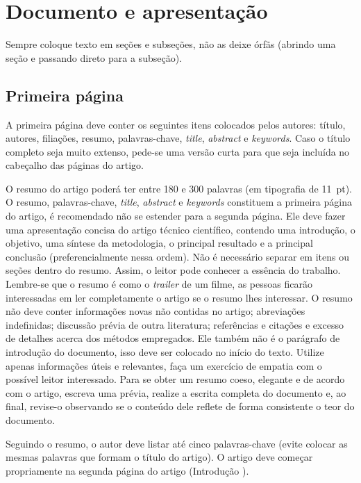\section{Documento e apresentação}

Sempre coloque texto em seções e subseções, não as deixe órfãs (abrindo uma seção e passando direto para a subseção).

\subsection{Primeira página}

A primeira página deve conter os seguintes itens colocados pelos autores: título, autores, filiações, resumo, palavras-chave, \textit{title}, \textit{abstract} e \textit{keywords}. 
%
Caso o título completo seja muito extenso, pede-se uma versão curta para que seja incluída no cabeçalho das páginas do artigo.


O resumo do artigo poderá ter entre 180 e 300 palavras (em tipografia de 11~pt). O resumo, palavras-chave, \textit{title}, \textit{abstract} e \textit{keywords} constituem a primeira página do artigo, é recomendado não se estender para a segunda página. 
Ele deve fazer uma apresentação concisa do artigo técnico científico, contendo uma introdução, o objetivo, uma síntese da metodologia, o principal resultado e a principal conclusão (preferencialmente nessa ordem). Não é necessário separar em itens ou seções dentro do resumo. Assim, o leitor pode conhecer a essência do trabalho. Lembre-se que o resumo é como o \textit{trailer} de um filme, as pessoas ficarão interessadas em ler completamente o artigo se o resumo lhes interessar. O resumo não deve conter informações novas não contidas no artigo; abreviações indefinidas; discussão prévia de outra literatura; referências e citações e excesso de detalhes acerca dos métodos empregados. Ele também não é o parágrafo de introdução do documento, isso deve ser colocado no início do texto. Utilize apenas informações úteis e relevantes, faça um exercício de empatia com o possível leitor interessado. Para se obter um resumo coeso, elegante e de acordo com o artigo, escreva uma prévia, realize a escrita completa do documento e, ao final, revise-o observando se o conteúdo dele reflete de forma consistente o teor do documento. 

Seguindo o resumo, o autor deve listar até cinco palavras-chave (evite colocar as mesmas palavras que formam o título do artigo). O artigo deve começar propriamente na segunda página do artigo (Introdução \etc).

